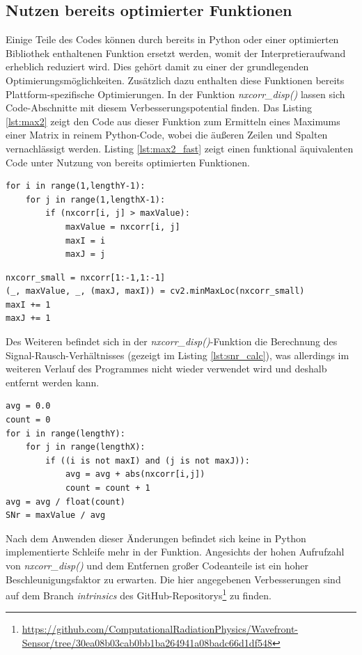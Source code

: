 \subsection{Nutzen bereits optimierter Funktionen}

Einige Teile des Codes können durch bereits in Python oder einer optimierten Bibliothek enthaltenen Funktion ersetzt werden, womit der Interpretieraufwand erheblich reduziert wird. Dies gehört damit zu einer der grundlegenden Optimierungsmöglichkeiten. Zusätzlich dazu enthalten diese Funktionen bereits Plattform-spezifische Optimierungen. In der Funktion \textit{nxcorr\_disp()} lassen sich Code-Abschnitte mit diesem Verbesserungspotential finden. Das Listing \ref{lst:max2} zeigt den Code aus dieser Funktion zum Ermitteln eines Maximums einer Matrix in reinem Python-Code, wobei die äußeren Zeilen und Spalten vernachlässigt werden. Listing \ref{lst:max2_fast} zeigt einen funktional äquivalenten Code unter Nutzung von bereits optimierten Funktionen. 

\begin{lstlisting}[caption={Finden des Maximums einer Matrix}, label={lst:max2}]
for i in range(1,lengthY-1):
	for j in range(1,lengthX-1):
		if (nxcorr[i, j] > maxValue):
			maxValue = nxcorr[i, j]
			maxI = i
			maxJ = j
\end{lstlisting}

\begin{lstlisting}[caption={Finden des Maximums einer Matrix mittels NumPy und OpenCV}, label={lst:max2_fast}]
nxcorr_small = nxcorr[1:-1,1:-1]
(_, maxValue, _, (maxJ, maxI)) = cv2.minMaxLoc(nxcorr_small)
maxI += 1
maxJ += 1
\end{lstlisting}

Des Weiteren befindet sich in der \textit{nxcorr\_disp()}-Funktion die Berechnung des Signal-Rausch-Verhältnisses (gezeigt im Listing \ref{lst:snr_calc}), was allerdings im weiteren Verlauf des Programmes nicht wieder verwendet wird und deshalb entfernt werden kann. 

\begin{lstlisting}[caption={Berechnung des Signal-Rausch-Verhältnisses}, label={lst:snr_calc}]
avg = 0.0
count = 0
for i in range(lengthY):
	for j in range(lengthX):
		if ((i is not maxI) and (j is not maxJ)):
			avg = avg + abs(nxcorr[i,j])
			count = count + 1
avg = avg / float(count)
SNr = maxValue / avg
\end{lstlisting}

Nach dem Anwenden dieser Änderungen befindet sich keine in Python implementierte Schleife mehr in der Funktion. Angesichts der hohen Aufrufzahl von \textit{nxcorr\_disp()} und dem Entfernen großer Codeanteile ist ein hoher Beschleunigungsfaktor zu erwarten. Die hier angegebenen Verbesserungen sind auf dem Branch \textit{intrinsics} des GitHub-Repositorys\footnote{\url{https://github.com/ComputationalRadiationPhysics/Wavefront-Sensor/tree/30ea08b03cab0bb1ba264941a08badc66d1df548}} zu finden. 

